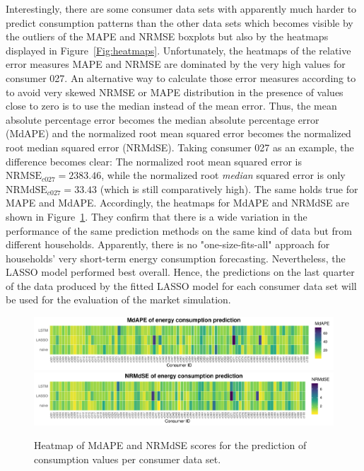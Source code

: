 Interestingly, there are some consumer data sets with apparently much harder to predict consumption patterns than the other data sets which becomes visible by the outliers of the MAPE and NRMSE boxplots but also by the heatmaps displayed in Figure~\ref{Fig:heatmaps}. Unfortunately, the heatmaps of the relative error measures MAPE and NRMSE are dominated by the very high values for consumer 027. An alternative way to calculate those error measures according to \citet{Hyndman:2006} to avoid very skewed NRMSE or MAPE distribution in the presence of values close to zero is to use the median instead of the mean error. Thus, the mean absolute percentage error becomes the median absolute percentage error (MdAPE) and the normalized root mean squared error becomes the normalized root median squared error (NRMdSE). Taking consumer 027 as an example, the difference becomes clear: The normalized root mean squared error is $\text{NRMSE}_{c027}=2383.46$, while the normalized root \emph{median} squared error is only $\text{NRMdSE}_{c027}=33.43$ (which is still comparatively high). The same holds true for MAPE and MdAPE. Accordingly, the heatmaps for MdAPE and NRMdSE are shown in Figure~\ref{Fig:heatmaps_median}. They confirm that there is a wide variation in the performance of the same prediction methods on the same kind of data but from different households. Apparently, there is no "one-size-fits-all" approach for households' very short-term energy consumption forecasting. Nevertheless, the LASSO model performed best overall. Hence, the predictions on the last quarter of the data produced by the fitted LASSO model for each consumer data set will be used for the evaluation of the market simulation.
%
\begin{figure}[htbp]
 \centering
 \includegraphics[width=\textwidth]{thesis/graphs/evaluation/c_heatmap_MdAPE.pdf}
 \includegraphics[width=\textwidth]{thesis/graphs/evaluation/c_heatmap_NRMdSE.pdf}
\caption[Heatmaps of MdAPE and NRMdSE for consumption values]{Heatmap of MdAPE and NRMdSE scores for the prediction of consumption values per consumer data set. \quantnet\href{ }{}}
\label{Fig:heatmaps_median}
\end{figure}
%


